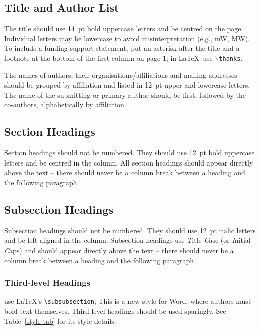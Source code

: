 \documentclass[acus]{jacow}
\begin{document}
\subsection{Title and Author List}

The title should use \SI{14}{pt} bold uppercase letters and be centred on the page.
Individual letters may be lowercase to avoid misinterpretation (e.g., mW, MW).
To include a funding support statement, put an asterisk after the title and a
footnote at the bottom of the first column on page 1; in \LaTeX\ use
$\backslash$\texttt{thanks}.

The names of authors, their organisations/affiliations and mailing addresses
should be grouped by affiliation and listed in \SI{12}{pt} upper and lowercase letters.
The name of the submitting or primary author should be first, followed by
the co-authors, alphabetically by affiliation.


\subsection{Section Headings}

Section headings should not be numbered. They should
use  \SI{12}{pt}  bold  uppercase  letters  and  be  centred  in  the
column. All section headings should appear directly above
the text -- there should never be a column break between a heading and the
following paragraph.

\subsection{Subsection Headings}

Subsection  headings  should  not  be  numbered.
They should use \SI{12}{pt} italic letters and be left aligned in the column.
Subsection headings use \emph{T}itle \emph{C}ase (or \emph{I}nitial \emph{C}aps)
and should appear directly above the text -- there should never be a column break
between a heading and the following paragraph.

\subsubsection{Third-level Headings} use \LaTeX's \verb|\subsubsection|;
This is a new style for Word, where authors must bold text themselves.
Third-level headings should be used sparingly. See Table~\ref{style-tab} for its
style details.
\end{document}
